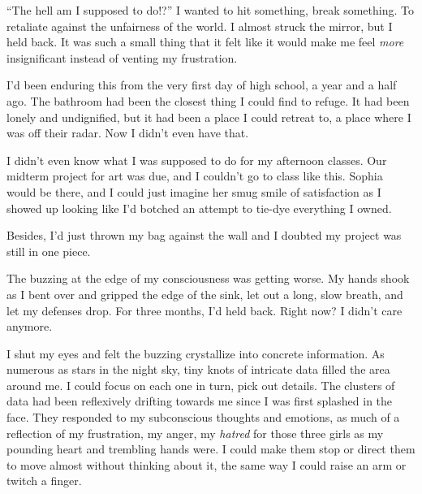``The hell am I supposed to do!?''  I wanted to hit something, break something.  To retaliate against the unfairness of the world.  I almost struck the mirror, but I held back.  It was such a small thing that it felt like it would make me feel \emph{more} insignificant instead of venting my frustration.



I'd been enduring this from the very first day of high school, a year and a half ago.  The bathroom had been the closest thing I could find to refuge.  It had been lonely and undignified, but it had been a place I could retreat to, a place where I was off their radar.  Now I didn't even have that.



I didn't even know what I was supposed to do for my afternoon classes.  Our midterm project for art was due, and I couldn't go to class like this.  Sophia would be there, and I could just imagine her smug smile of satisfaction as I showed up looking like I'd botched an attempt to tie-dye everything I owned.



Besides, I'd just thrown my bag against the wall and I doubted my project was still in one piece.



The buzzing at the edge of my consciousness was getting worse.  My hands shook as I bent over and gripped the edge of the sink, let out a long, slow breath, and let my defenses drop.  For three months, I'd held back.  Right now?  I didn't care anymore.



I shut my eyes and felt the buzzing crystallize into concrete information.  As numerous as stars in the night sky, tiny knots of intricate data filled the area around me.  I could focus on each one in turn, pick out details.  The clusters of data had been reflexively drifting towards me since I was first splashed in the face.  They responded to my subconscious thoughts and emotions, as much of a reflection of my frustration, my anger, my \emph{hatred} for those three girls as my pounding heart and trembling hands were.  I could make them stop or direct them to move almost without thinking about it, the same way I could raise an arm or twitch a finger.



